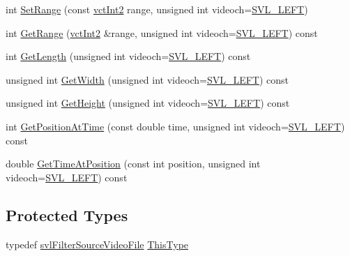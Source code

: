 \begin{DoxyCompactItemize}
\item 
int \hyperlink{classsvl_filter_source_video_file_a658c3b7555b5071933a6a26bc93a42e3}{Set\+Range} (const \hyperlink{vct_fixed_size_vector_types_8h_add8c88eb6a432b15f14b866b9c35325f}{vct\+Int2} range, unsigned int videoch=\hyperlink{svl_definitions_8h_ab9fec7615f19c8df2919eebcab0b187f}{S\+V\+L\+\_\+\+L\+E\+F\+T})
\item 
int \hyperlink{classsvl_filter_source_video_file_a6a19e03fcda1829cf24a47cb53171487}{Get\+Range} (\hyperlink{vct_fixed_size_vector_types_8h_add8c88eb6a432b15f14b866b9c35325f}{vct\+Int2} \&range, unsigned int videoch=\hyperlink{svl_definitions_8h_ab9fec7615f19c8df2919eebcab0b187f}{S\+V\+L\+\_\+\+L\+E\+F\+T}) const 
\item 
int \hyperlink{classsvl_filter_source_video_file_aca502a69e8abf2b6156b7850141fcc42}{Get\+Length} (unsigned int videoch=\hyperlink{svl_definitions_8h_ab9fec7615f19c8df2919eebcab0b187f}{S\+V\+L\+\_\+\+L\+E\+F\+T}) const 
\item 
unsigned int \hyperlink{classsvl_filter_source_video_file_a17c0711b47133030b480af03ec07c219}{Get\+Width} (unsigned int videoch=\hyperlink{svl_definitions_8h_ab9fec7615f19c8df2919eebcab0b187f}{S\+V\+L\+\_\+\+L\+E\+F\+T}) const 
\item 
unsigned int \hyperlink{classsvl_filter_source_video_file_a23da7b7caccb0cbfe05b1c44629ce0ca}{Get\+Height} (unsigned int videoch=\hyperlink{svl_definitions_8h_ab9fec7615f19c8df2919eebcab0b187f}{S\+V\+L\+\_\+\+L\+E\+F\+T}) const 
\item 
int \hyperlink{classsvl_filter_source_video_file_a0f110dd6f47bdb99aff61b5e2df0d506}{Get\+Position\+At\+Time} (const double time, unsigned int videoch=\hyperlink{svl_definitions_8h_ab9fec7615f19c8df2919eebcab0b187f}{S\+V\+L\+\_\+\+L\+E\+F\+T}) const 
\item 
double \hyperlink{classsvl_filter_source_video_file_ae389217965dc7b199eae5fd3794d664a}{Get\+Time\+At\+Position} (const int position, unsigned int videoch=\hyperlink{svl_definitions_8h_ab9fec7615f19c8df2919eebcab0b187f}{S\+V\+L\+\_\+\+L\+E\+F\+T}) const 
\end{DoxyCompactItemize}
\subsection*{Protected Types}
\begin{DoxyCompactItemize}
\item 
typedef \hyperlink{classsvl_filter_source_video_file}{svl\+Filter\+Source\+Video\+File} \hyperlink{classsvl_filter_source_video_file_a64bb04cd76d1088e40860d6f0d2e1897}{This\+Type}
\end{DoxyCompactItemize}
